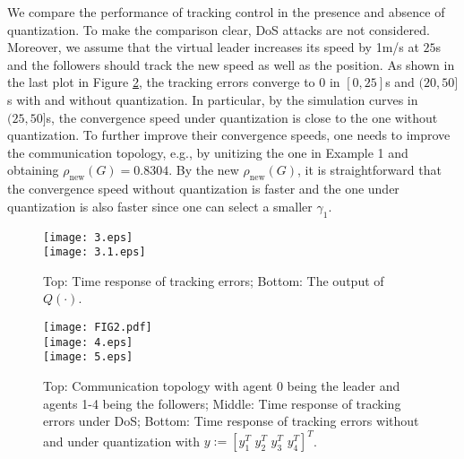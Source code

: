 \documentclass{autart}
\begin{document}
We compare the performance of tracking control in the presence and absence of quantization. To make the comparison clear, DoS attacks are not considered. Moreover, we assume that the virtual leader increases its speed by 1m/s at $25$s and the followers should track the new speed as well as the position. As shown in the last plot in Figure \ref{example3}, the tracking errors converge to 0 in $[0, 25]$s and $(20, 50]$s with and without quantization. In particular, by the simulation curves in $(25, 50]$s, the convergence speed under quantization is close to the one without quantization. To further improve their convergence speeds, one needs to improve the communication topology, e.g., by unitizing the one in Example 1 and obtaining $\rho_{\text{new}}(G)=0.8304$. By the new $\rho_{\text{new}}(G)$, it is straightforward that the convergence speed without quantization is faster and the one under quantization is also faster since one can select a smaller $\gamma_1$.






\begin{figure}[t]
	\begin{center}
		\texttt{[image: 3.eps]} \\
		\texttt{[image: 3.1.eps]} \\
				\vspace{-2mm}
		\linespread{1}\caption{Top: Time response of tracking errors; Bottom: The output of $Q(\cdot)$.}\label{example2}
	\end{center}
\end{figure}

 
\begin{figure}[t]
	\begin{center}
				\texttt{[image: FIG2.pdf]} \\
				\vspace{2mm}
		\texttt{[image: 4.eps]} \\
				\texttt{[image: 5.eps]} \\
		\vspace{-2mm}
		\linespread{1}\caption{Top: Communication topology with agent 0 being the leader and agents 1-4 being the followers; Middle: Time response of tracking errors under DoS; Bottom: Time response of tracking errors without and under quantization with $y:=[y_1 ^T \,\,y_2 ^T\,\,y_3 ^T\,\,y_4 ^T ]^T$.}\label{example3}
	\end{center}
\end{figure}
\end{document}
